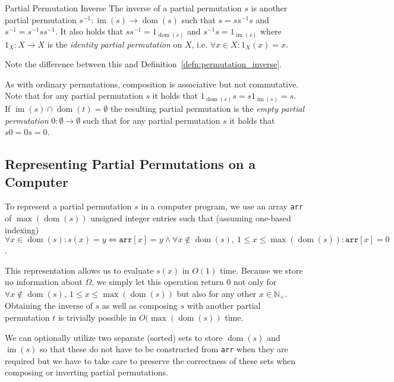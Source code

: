 \begin{defn}[label=defn:partial_permutation_inverse]{Partial Permutation Inverse}
  The inverse of a partial permutation $s$ is another partial permutation
  $s^{-1}: \operatorname{im}(s) \rightarrow \operatorname{dom}(s)$ such that $s =
  s s^{-1} s$ and $s^{-1} = s^{-1} s s^{-1}$. It also holds that $s s^{-1} =
  1_{\operatorname{dom}(s)}$ and $s^{-1} s = 1_{\operatorname{im}(s)}$ where
  $1_X: X \rightarrow X$ is the \textit{identity partial permutation} on $X$,
  i.e. $\forall x \in X: 1_X(x) = x$.
\end{defn}
%
Note the difference between this and Definition~\ref{defn:permutation_inverse}.

As with ordinary permutations, composition is associative but not
commutative. Note that for any partial permutation $s$ it holds that
$1_{\operatorname{dom}(s)} s = s 1_{\operatorname{im}(s)} = s$.  If
$\operatorname{im}(s) \cap \operatorname{dom}(t) = \emptyset$ the resulting
partial permutation is the \textit{empty partial permutation} $0: \emptyset
\rightarrow \emptyset$ such that for any partial permutation $s$ it holds that
$s 0 = 0 s = 0$.

\subsection{Representing Partial Permutations on a Computer}

To represent a partial permutation $s$ in a computer program, we use an array
\texttt{arr} of $\max(\operatorname{dom}(s))$ unsigned integer entries such
that (assuming one-based indexing) $\forall x \in \operatorname{dom}(s): s(x) =
y \Leftrightarrow \texttt{arr}[x] = y \land \forall x \notin
\operatorname{dom}(s),\ 1 \leq x \leq \max(\operatorname{dom}(s)):
\texttt{arr}[x] = 0$.

This representation allows us to evaluate $s(x)$ in $O(1)$ time. Because we
store no information about $\Omega$, we simply let this operation return $0$
not only for $\forall x \notin \operatorname{dom}(s),\ 1 \leq x \leq
\max(\operatorname{dom}(s))$ but also for any other $x \in \mathbb{N}_+$.
Obtaining the inverse of $s$ as well as composing $s$ with another partial
permutation $t$ is trivially possible in $O(\max(\operatorname{dom}(s))$ time.

We can optionally utilize two separate (sorted) sets to store
$\operatorname{dom}(s)$ and $\operatorname{im}(s)$ so that these do not have to
be constructed from \texttt{arr} when they are required but we have to take
care to preserve the correctness of these sets when composing or inverting
partial permutations.

